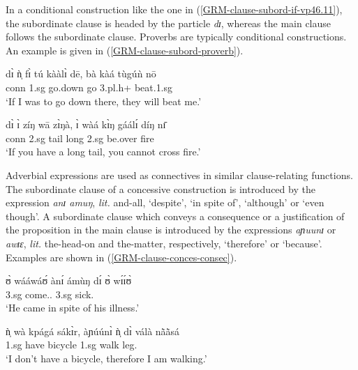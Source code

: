 In a conditional construction like the one in
(\ref{GRM-clause-subord-if-vp46.11}), the subordinate
clause is headed by the particle {\it dɪ},  whereas the main clause follows
the subordinate clause. Proverbs are typically  conditional
constructions.  An example is given in (\ref{GRM-clause-subord-proverb}).


\ea\label{GRM-clause-subord-di}

\ea\label{GRM-clause-subord-if-vp46.11}

\gll dɪ̀ ǹ̩ fɪ̀ tú kààlɪ̀ dē, bà kàá  tùgúǹ nō \\
      {\sc conn}  {\sc 1.sg} {\mod} {go.down} go {\adv} {\sc 3.pl.h+} {\fut}
beat.{\sc 1.sg} {\foc} \\
\glt  `If I was to go down there, they will beat me.' 

\ex\label{GRM-clause-subord-proverb}
\gll dɪ̀ ɪ̀ zíŋ wā zɪ̀ŋà,  ɪ̀ wàá kɪ̀ŋ gáálɪ́ díŋ nɪ̄ \\
  {\sc conn} {\sc 2.sg}  tail {\ingr} long  {\sc 2.sg} {\neg} {\abl} be.over
fire
{\postp}\\
`If you have a long tail, you cannot cross fire.'


 \z 
 \z
 

Adverbial expressions are used as connectives in similar clause-relating
functions. The subordinate clause of a concessive construction is introduced by
the expression  {\it anɪ amuŋ}, {\it lit.} and-all, `despite',  `in spite
of', `although' or `even though'. A subordinate clause  which conveys a
consequence or a justification of the proposition in the main clause  is
introduced by the expressions {\it aɲuunɪ} or {\it awɪɛ}, {\it lit.} the-head-on
 and  the-matter,  respectively,  `therefore' or
`because'. Examples are shown in (\ref{GRM-clause-conces-consec}).

\ea\label{GRM-clause-conces-consec}

\ea\label{GRM-clause-conces}

\gll ʊ̀ wááwáʊ́ {ànɪ́ ámùŋ} dɪ́ ʊ̀ wɪ́ɪ́ʊ̀ \\
       {\sc 3.sg} come.{\pfv .\foc} {\conn} {\comp}  {\sc 3.sg} sick.{\foc}\\
\glt  `He came in spite of his illness.' 


\ex\label{GRM-clause-consec-1}

\gll ǹ̩ wà kpágá sákɪ̀r, {àɲúúnɪ̀} ǹ̩ dɪ̀ válà nã̀ã̀sá \\
{\sc 1.sg} {\neg} have bicycle {\conn} {\sc 1.sg}   {\ipfv} walk
leg.{\pl}\\
\glt `I don't have a bicycle, therefore I am
walking.'


